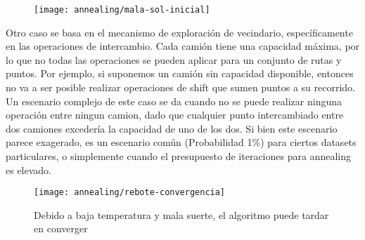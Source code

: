 \begin{figure}[H]
\texttt{[image: annealing/mala-sol-inicial]}
\centering
\end{figure}

Otro caso se basa en el mecanismo de exploración de vecindario, específicamente en las operaciones de intercambio. Cada camión tiene una capacidad máxima, por lo que no todas las operaciones se pueden aplicar para un conjunto de rutas y puntos.
Por ejemplo, si suponemos un camión sin capacidad disponible, entonces no va a ser posible realizar operaciones de shift que sumen puntos a su recorrido.
Un escenario complejo de este caso se da cuando no se puede realizar ninguna operación entre ningun camion, dado que cualquier punto intercambiado entre dos camiones excedería la capacidad de uno de los dos.
Si bien este escenario parece exagerado, es un escenario común (Probabilidad 1\%) para ciertos datasets particulares, o simplemente cuando el presupuesto de iteraciones para annealing es elevado.

\begin{figure}[H]
\texttt{[image: annealing/rebote-convergencia]}
\centering
\caption{Debido a baja temperatura y mala suerte, el algoritmo puede tardar en converger}

\end{figure}

